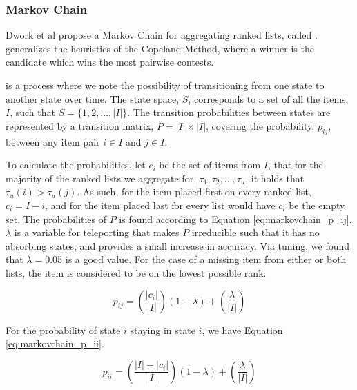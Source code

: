 \subsubsection{Markov Chain}\label{sec:markovchain}

Dwork et al propose a Markov Chain for aggregating ranked lists, called \MC\cite{rank:aggregation}. \MC generalizes the heuristics of the Copeland Method, where a winner is the candidate which wins the most pairwise contests\cite{saari1996}.

\MC is a process where we note the possibility of transitioning from one state to another state over time. The \MC state space, $S$, corresponds to a set of all the items, $I$, such that $S = \{1, 2,..., |I|\}$. The transition probabilities between states are represented by a transition matrix, $P = |I| \times |I|$, covering the probability, $p_{ij}$, between any item pair $i \in I$ and $j \in I$.

To calculate the probabilities, let $c_i$ be the set of items from $I$, that for the majority of the ranked lists we aggregate for, $\tau_1, \tau_2, ...,\tau_u$, it holds that $\tau_u(i) > \tau_u(j)$. As such, for the item placed first on every ranked list, $c_i = I-i$, and for the item placed last for every list would have $c_i$ be the empty set. The probabilities of $P$ is found according to Equation \ref{eq:markovchain_p_ij}. $\lambda$ is a variable for teleporting that makes $P$ irreducible such that it has no absorbing states, and provides a small increase in accuracy.  Via tuning, we found that $\lambda = 0.05$ is a good value. For the case of a missing item from either or both lists, the item is considered to be on the lowest possible rank.

\begin{equation}\label{eq:markovchain_p_ij}
p_{ij} = (\frac{|c_i|}{|I|})(1-\lambda)+(\frac{\lambda}{|I|})
\end{equation}

For the probability of state $i$ staying in state $i$, we have Equation \ref{eq:markovchain_p_ii}.

\begin{equation}\label{eq:markovchain_p_ii}
p_{ii} = (\frac{|I|-|c_i|}{|I|})(1-\lambda)+(\frac{\lambda}{|I|})
\end{equation}

